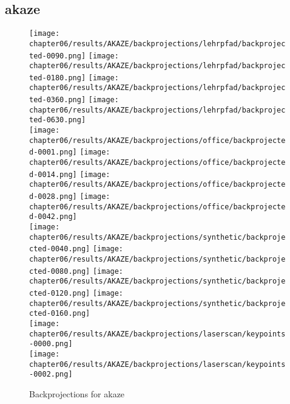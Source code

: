\subsection{\acrshort{akaze}}\label{sec:lehrpfad_conversions}
\begin{figure}[H]
    \texttt{[image: chapter06/results/AKAZE/backprojections/lehrpfad/backprojected-0090.png]}%
    \texttt{[image: chapter06/results/AKAZE/backprojections/lehrpfad/backprojected-0180.png]}%
    \texttt{[image: chapter06/results/AKAZE/backprojections/lehrpfad/backprojected-0360.png]}%
    \texttt{[image: chapter06/results/AKAZE/backprojections/lehrpfad/backprojected-0630.png]}\\
    \texttt{[image: chapter06/results/AKAZE/backprojections/office/backprojected-0001.png]}%
    \texttt{[image: chapter06/results/AKAZE/backprojections/office/backprojected-0014.png]}%
    \texttt{[image: chapter06/results/AKAZE/backprojections/office/backprojected-0028.png]}%
    \texttt{[image: chapter06/results/AKAZE/backprojections/office/backprojected-0042.png]}\\
    \texttt{[image: chapter06/results/AKAZE/backprojections/synthetic/backprojected-0040.png]}%
    \texttt{[image: chapter06/results/AKAZE/backprojections/synthetic/backprojected-0080.png]}%
    \texttt{[image: chapter06/results/AKAZE/backprojections/synthetic/backprojected-0120.png]}%
    \texttt{[image: chapter06/results/AKAZE/backprojections/synthetic/backprojected-0160.png]}\\
    \texttt{[image: chapter06/results/AKAZE/backprojections/laserscan/keypoints-0000.png]}\\
    \texttt{[image: chapter06/results/AKAZE/backprojections/laserscan/keypoints-0002.png]}\\
    \caption{Backprojections for \acrshort{akaze}}
\end{figure}
